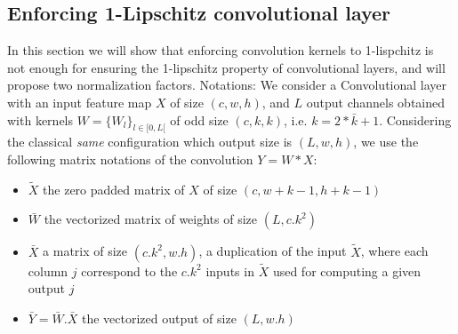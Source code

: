 \subsection{Enforcing 1-Lipschitz convolutional layer}
\label{sec:ConvLayer1Lip}
\label{sec:ConvLayerMatrix}
In this section we will show that enforcing convolution kernels to 1-lispchitz is not enough for ensuring the 1-lipschitz property of convolutional layers, and will propose two normalization factors. 
Notations: We consider a Convolutional layer with an input feature map $X$ of size $(c,w,h)$, and $L$ output channels obtained with kernels $W=\{W_l\}_{l\in[0,L[}$ of odd size $(c,k,k)$, i.e. $k=2*\bar{k}+1$. Considering the classical \textit{same} configuration which output size is $(L,w,h)$, we use the following matrix notations of the convolution $Y=W \ast X$:
\begin{itemize}
    \item $\widetilde{X}$ the zero padded matrix of $X$ of size $(c,w+k-1,h+k-1)$
    \item $\bar{W}$ the vectorized matrix of weights of size $(L,c.k^2)$
    \item $\bar{X}$ a matrix of size $(c.k^2,w.h)$, a duplication of the input $\widetilde{X}$, where each column $j$ correspond to the $c.k^2$ inputs in $\widetilde{X}$ used for computing a given output $j$
 

    \item $\bar{Y} = \bar{W}.\bar{X}$ the vectorized output of size $(L,w.h)$
\end{itemize}


